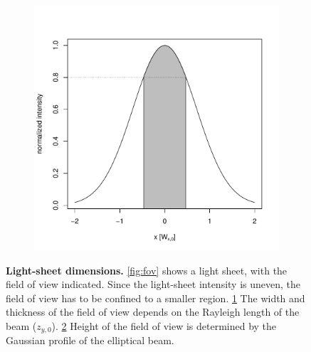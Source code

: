 \documentclass{diploma_style}
\begin{document}
\begin{figure}[b!]
\begin{subfigure}[b]{0.49\textwidth}
		\caption{}
		\label{fig:width}
	\end{subfigure}
	\begin{subfigure}[b]{0.49\textwidth}
		\centering
		\includegraphics[width=\textwidth]{figures/1_spim/height}
		\caption{}
		\label{fig:height}
	\end{subfigure}
	\caption{\textbf{Light-sheet dimensions.} \ref{fig:fov} shows a light sheet, with the field of view indicated. Since the light-sheet intensity is uneven, the field of view has to be confined to a smaller region. \ref{fig:width} The width and thickness of the field of view depends on the Rayleigh length of the beam ($z_{y,0}$). \ref{fig:height} Height of the field of view is determined by the Gaussian profile of the elliptical beam.}
	\label{fig:ls_dim}
\end{figure}
\end{document}
